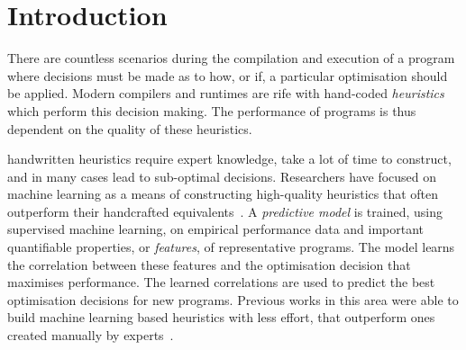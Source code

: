 \section{Introduction}

%
%
%

There are countless scenarios during the compilation and execution of a program where decisions must be made as to how, or if, a particular optimisation should be applied. Modern compilers and runtimes are rife with hand-coded \emph{heuristics} which perform this decision making. The performance of programs is thus dependent on the quality of these heuristics.

handwritten heuristics require expert knowledge, take a lot of time to construct, and in many cases lead to sub-optimal decisions. Researchers have focused on machine learning as a means of constructing high-quality heuristics that often outperform their handcrafted equivalents~\cite{Micolet2016,Falch2015,Stephenson2005,Agakov,Cummins2015a}. A \emph{predictive model} is trained, using supervised machine learning, on empirical performance data and important quantifiable properties, or \emph{features}, of representative programs. The model learns the correlation between these features and the optimisation decision that maximises performance. The learned correlations are used to predict the best optimisation decisions for new programs. Previous works in this area were able to build machine learning based heuristics with less effort, that outperform ones created manually by experts~\cite{Grewe2013,Magni2014}.

